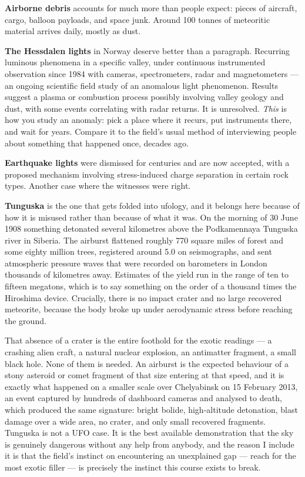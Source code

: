 \textbf{Airborne debris} accounts for much more than people expect: pieces of aircraft, cargo,
balloon payloads, and space junk. Around 100 tonnes of meteoritic material arrives daily, mostly
as dust.

\textbf{The Hessdalen lights} in Norway deserve better than a paragraph. Recurring luminous
phenomena in a specific valley, under continuous instrumented observation since 1984 with
cameras, spectrometers, radar and magnetometers --- an ongoing scientific field study of an
anomalous light phenomenon. Results suggest a plasma or combustion process possibly involving
valley geology and dust, with some events correlating with radar returns. It is unresolved.
\emph{This} is how you study an anomaly: pick a place where it recurs, put instruments there, and
wait for years. Compare it to the field's usual method of interviewing people about something
that happened once, decades ago.

\textbf{Earthquake lights} were dismissed for centuries and are now accepted, with a proposed
mechanism involving stress-induced charge separation in certain rock types. Another case where the
witnesses were right.

\textbf{Tunguska} is the one that gets folded into ufology, and it belongs here because of how it
is misused rather than because of what it was. On the morning of 30 June 1908 something detonated
several kilometres above the Podkamennaya Tunguska river in Siberia. The airburst flattened
roughly 770 square miles of forest and some eighty million trees, registered around 5.0 on
seismographs, and sent atmospheric pressure waves that were recorded on barometers in London
thousands of kilometres away. Estimates of the yield run in the range of ten to fifteen megatons,
which is to say something on the order of a thousand times the Hiroshima device. Crucially, there
is no impact crater and no large recovered meteorite, because the body broke up under
aerodynamic stress before reaching the ground.

That absence of a crater is the entire foothold for the exotic readings --- a crashing alien craft,
a natural nuclear explosion, an antimatter fragment, a small black hole. None of them is needed.
An airburst is the expected behaviour of a stony asteroid or comet fragment of that size entering
at that speed, and it is exactly what happened on a smaller scale over Chelyabinsk on 15 February
2013, an event captured by hundreds of dashboard cameras and analysed to death, which produced
the same signature: bright bolide, high-altitude detonation, blast damage over a wide area, no
crater, and only small recovered fragments. Tunguska is not a UFO case. It is the best available
demonstration that the sky is genuinely dangerous without any help from anybody, and the reason I
include it is that the field's instinct on encountering an unexplained gap --- reach for the most
exotic filler --- is precisely the instinct this course exists to break.

